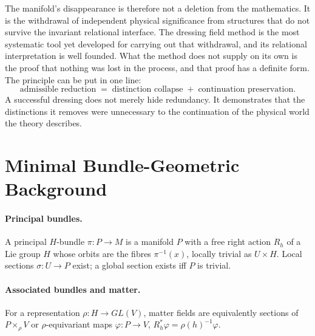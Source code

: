 \documentclass[11pt]{article}
\theoremstyle{plain}
\theoremstyle{definition}
\theoremstyle{remark}
\begin{document}
The manifold's disappearance is therefore not a deletion from the mathematics. It is the withdrawal of independent physical significance from structures that do not survive the invariant relational interface. The dressing field method is the most systematic tool yet developed for carrying out that withdrawal, and its relational interpretation is well founded. What the method does not supply on its own is the proof that nothing was lost in the process, and that proof has a definite form. The principle can be put in one line:
\begin{equation}
\text{admissible reduction}\;=\;\text{distinction collapse}\;+\;\text{continuation preservation}.
\end{equation}
A successful dressing does not merely hide redundancy. It demonstrates that the distinctions it removes were unnecessary to the continuation of the physical world the theory describes.

\appendix
\section{Minimal Bundle-Geometric Background}\label{app:bundle}

\paragraph{Principal bundles.} A principal $H$-bundle $\pi:P\to M$ is a manifold $P$ with a free right action $R_h$ of a Lie group $H$ whose orbits are the fibres $\pi^{-1}(x)$, locally trivial as $U\times H$. Local sections $\sigma:U\to P$ exist; a global section exists iff $P$ is trivial.

\paragraph{Associated bundles and matter.} For a representation $\rho:H\to GL(V)$, matter fields are equivalently sections of $P\times_\rho V$ or $\rho$-equivariant maps $\varphi:P\to V$, $R_h^*\varphi=\rho(h)^{-1}\varphi$.
\end{document}
